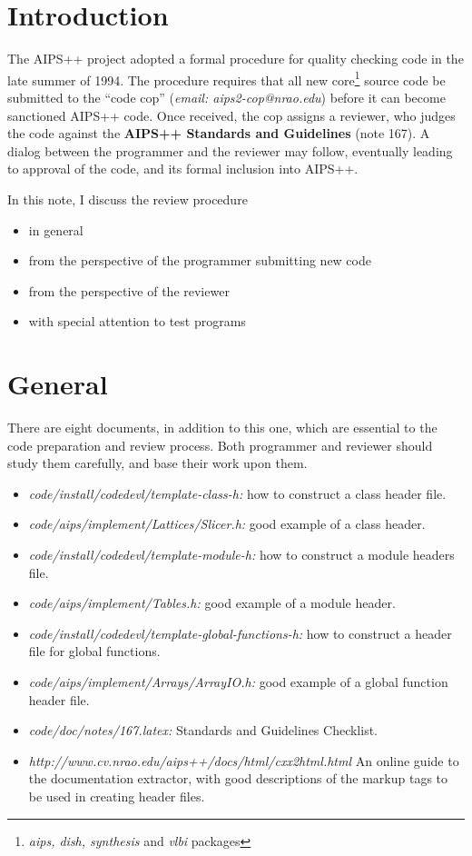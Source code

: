 \section{Introduction} The AIPS++ project adopted a formal procedure
for quality checking code in the late summer of 1994.  The
procedure requires that all new core\footnote{{\it aips, dish, synthesis} 
and {\it vlbi} packages} source code be submitted to the ``code
cop'' ({\it email: aips2-cop@nrao.edu}) before it can become sanctioned
AIPS++ code.  Once received, the cop assigns a reviewer, who judges
the code against the {\bf AIPS++ Standards and Guidelines}
(note 167).  A dialog between the programmer and the reviewer may 
follow, eventually leading to approval of the code, and its formal
inclusion into AIPS++.   

In this note, I discuss the review procedure
\begin{itemize}
  \item in general
  \item from the perspective of the programmer submitting new code
  \item from the perspective of the reviewer
  \item with special attention to test programs
\end{itemize}

\section{General}
There are eight documents, in addition to this one, which are
essential to the code preparation and review process.  Both programmer
and reviewer should study them carefully, and base their work upon them.

\begin{itemize}
  \item {\em code/install/codedevl/template-class-h:}  how to construct a
      class header file.
  \item {\em code/aips/implement/Lattices/Slicer.h:} good example of a
      class header.
  \item {\em code/install/codedevl/template-module-h:} how to construct a module 
     headers file.
  \item {\em code/aips/implement/Tables.h:} good example of a module header.
  \item {\em code/install/codedevl/template-global-functions-h:}  how to 
      construct a  header file for global functions.
  \item {\em code/aips/implement/Arrays/ArrayIO.h:} good example of a
      global function header file.
  \item {\em code/doc/notes/167.latex:} Standards and Guidelines Checklist.
  \item {\em http://www.cv.nrao.edu/aips++/docs/html/cxx2html.html} An online
      guide to the documentation extractor, with good descriptions of the
      markup tags to be used in creating header files.
\end{itemize}

